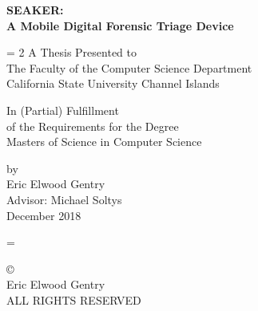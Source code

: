 \documentclass[12pt]{article}
\newcommand{\A}{\mathcal{A}}
\begin{document}
\begin{titlepage}
\begin{center}
{\Large \bfseries SEAKER:\protect\\A Mobile Digital Forensic Triage Device \par}

\vspace{2 cm}
\baselineskip = 2\baselineskip
A Thesis Presented to \\
The Faculty of the Computer Science Department\\
California State University Channel Islands

\vspace{1 cm}

In (Partial) Fulfillment\\
of the Requirements for the Degree\\
Masters of Science in Computer Science\\

\vspace{1 cm }

\vfill

by \\
Eric Elwood Gentry\\
Advisor: Michael Soltys\\
December 2018
\end{center}
\end{titlepage}
\baselineskip = \baselineskip

\newpage
\null
\vfill
\begin{flushleft}
\copyright{}\\
Eric Elwood Gentry\\
ALL RIGHTS RESERVED
\end{flushleft}
\newpage
\end{document}

